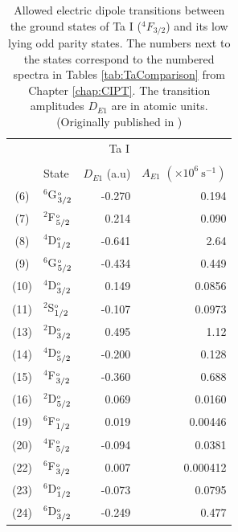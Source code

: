 \documentclass[10pt,a4paper, twoside, openright]{report}
\begin{document}
\begin{table}[t!] 
\centering
\caption[Electric dipole amplitudes and rates for allowed transitions in Ta I calculated using the CIPT method]{Allowed electric dipole transitions between the  ground states of Ta I ($^4F_{3/2}$) and its low lying odd parity states.  The numbers next to the states correspond to the numbered spectra in Tables \ref{tab:TaComparison} from Chapter \ref{chap:CIPT}. The transition amplitudes $D_{E1}$ are in atomic units. (Originally published in \cite{LDFDb2018}) \label{table:E1Amplitudes} }
\begin{tabular}{cl@{\hspace{0.75cm}}r@{\hspace{0.75cm}}r@{\hspace{0.75cm}}}  %
\toprule
\toprule
\multicolumn{4}{c}{Ta I}  \\ \\
 & State &   \multicolumn{1}{c}{\parbox{1cm}{$D_{E1}$ \\ (a.u)}} & \parbox{1.5cm}{$A_{E1}$ \\ $(\times 10^{6} \ \text{s}^{-1})$ } \\
\midrule
 (6) & $^6$G$^{\rm_o}_{3/2}$  & -0.270   & 0.194   \\
(7) & $^2$F$^{\rm_o}_{5/2}$  & 0.214 &  0.090   \\
(8) & $^4$D$^{\rm_o}_{1/2}$   & -0.641   & 2.64  \\
 (9) & $^6$G$^{\rm_o}_{5/2}$  & -0.434   & 0.449   \\
 (10) & $^4$D$^{\rm_o}_{3/2}$   & 0.149   &  0.0856   \\
 (11) &$^2$S$^{\rm_o}_{1/2}$    & -0.107  & 0.0973   \\
 (13) &$^2$D$^{\rm_o}_{3/2}$    & 0.495   & 1.12  \\
 (14) &$^4$D$^{\rm_o}_{5/2}$   & -0.200   &  0.128    \\
 (15) &$^4$F$^{\rm_o}_{3/2}$  & -0.360   & 0.688   \\
 (16) &$^2$D$^{\rm_o}_{5/2}$    & 0.069   & 0.0160   \\
 (19) &$^6$F$^{\rm_o}_{1/2}$   &   0.019   & 0.00446  \\
 (20) &$^4$F$^{\rm_o}_{5/2}$   &  -0.094   & 0.0381  \\
 (22) &$^6$F$^{\rm_o}_{3/2}$  & 0.007   & 0.000412  \\
 (23) &$^6$D$^{\rm_o}_{1/2}$    & -0.073   & 0.0795 \\
 (24) &$^6$D$^{\rm_o}_{3/2}$ & -0.249   & 0.477 \\

\end{tabular}
\end{table}
\end{document}
